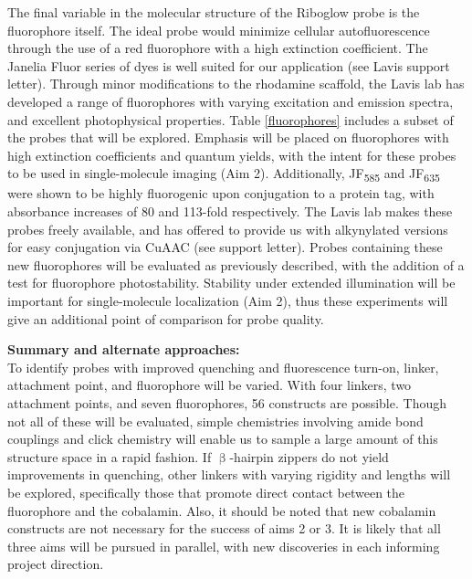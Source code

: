 The final variable in the molecular structure of the Riboglow probe is the fluorophore itself. The ideal probe would minimize cellular autofluorescence through the use of a red fluorophore with a high extinction coefficient. The Janelia Fluor series of dyes is well suited for our application (see Lavis support letter)\cite{Grimmgeneralmethodfinetune2017,Grimmgeneralmethodimprove2015}. Through minor modifications to the rhodamine scaffold, the Lavis lab has developed a range of fluorophores with varying excitation and emission spectra, and excellent photophysical properties.
Table \ref{fluorophores} includes a subset of the probes that will be explored.
Emphasis will be placed on fluorophores with high extinction coefficients and quantum yields, with the intent for these probes to be used in single-molecule imaging (Aim 2).
Additionally, JF\textsubscript{585} and JF\textsubscript{635} were shown to be highly fluorogenic upon conjugation to a protein tag, with absorbance increases of 80 and 113-fold respectively\cite{Grimmgeneralmethodfinetune2017}.
The Lavis lab makes these probes freely available, and has offered to provide us with alkynylated versions for easy conjugation via CuAAC (see support letter).
Probes containing these new fluorophores will be evaluated as previously described, with the addition of a test for fluorophore photostability.
Stability under extended illumination will be important for single-molecule localization (Aim 2), thus these experiments will give an additional point of comparison for probe quality.


\textbf{Summary and alternate approaches:}\\
To identify probes with improved quenching and fluorescence turn-on, linker, attachment point, and fluorophore will be varied. With four linkers, two attachment points, and seven fluorophores, 56 constructs are possible. Though not all of these will be evaluated, simple chemistries involving amide bond couplings and click chemistry will enable us to sample a large amount of this structure space in a rapid fashion. If $\upbeta$-hairpin zippers do not yield improvements in quenching, other linkers with varying rigidity and lengths will be explored\cite{LeeDesignSynthesisCharacterization2009}, specifically those that promote direct contact between the fluorophore and the cobalamin. Also, it should be noted that new cobalamin constructs are not necessary for the success of aims 2 or 3. It is likely that all three aims will be pursued in parallel, with new discoveries in each informing project direction.

